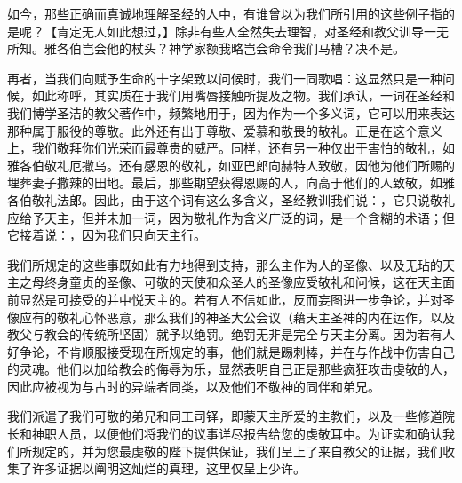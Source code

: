 如今，那些正确而真诚地理解圣经的人中，有谁曾以为我们所引用的这些例子指的是呢？【肯定无人如此想过，】除非有些人全然失去理智，对圣经和教父训导一无所知。雅各伯岂会他的杖头？神学家额我略岂会命令我们马槽？决不是。\par

再者，当我们向赋予生命的十字架致以问候时，我们一同歌唱：这显然只是一种问候，如此称呼，其实质在于我们用嘴唇接触所提及之物。我们承认，一词在圣经和我们博学圣洁的教父著作中，频繁地用于，因为作为一个多义词，它可以用来表达那种属于服役的尊敬。此外还有出于尊敬、爱慕和敬畏的敬礼。正是在这个意义上，我们敬拜你们光荣而最尊贵的威严。同样，还有另一种仅出于害怕的敬礼，如雅各伯敬礼厄撒乌。还有感恩的敬礼，如亚巴郎向赫特人致敬，因他为他们所赐的埋葬妻子撒辣的田地。最后，那些期望获得恩赐的人，向高于他们的人致敬，如雅各伯敬礼法郎。因此，由于这个词有这么多含义，圣经教训我们说：，它只说敬礼应给予天主，但并未加一词，因为敬礼作为含义广泛的词，是一个含糊的术语；但它接着说：，因为我们只向天主行。\par

我们所规定的这些事既如此有力地得到支持，那么主作为人的圣像、以及无玷的天主之母终身童贞的圣像、可敬的天使和众圣人的圣像应受敬礼和问候，这在天主面前显然是可接受的并中悦天主的。若有人不信如此，反而妄图进一步争论，并对圣像应有的敬礼心怀恶意，那么我们的神圣大公会议（藉天主圣神的内在运作，以及教父与教会的传统所坚固）就予以绝罚。绝罚无非是完全与天主分离。因为若有人好争论，不肯顺服接受现在所规定的事，他们就是踢刺棒，并在与作战中伤害自己的灵魂。他们以加给教会的侮辱为乐，显然表明自己正是那些疯狂攻击虔敬的人，因此应被视为与古时的异端者同类，以及他们不敬神的同伴和弟兄。\par

我们派遣了我们可敬的弟兄和同工司铎，即蒙天主所爱的主教们，以及一些修道院长和神职人员，以便他们将我们的议事详尽报告给您的虔敬耳中。为证实和确认我们所规定的，并为您最虔敬的陛下提供保证，我们呈上了来自教父的证据，我们收集了许多证据以阐明这灿烂的真理，这里仅呈上少许。\par

